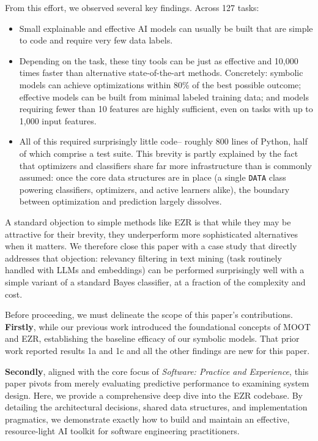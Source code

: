 \documentclass[AMA,STIX2COL]{WileyNJDv5}
\begin{document}
From this effort, we observed several key findings.
Across 127 tasks:
\begin{itemize}
\item
Small explainable and effective AI models can usually be built that are simple to code and require very few data labels. 
\item Depending on the task, these tiny tools can be just as effective and 10,000 times faster than alternative state-of-the-art methods. Concretely: symbolic models can achieve optimizations within 80\% of the best possible outcome; effective models can be built from minimal labeled training data; and models requiring fewer than 10 features are highly sufficient, even on tasks with up to 1,000 input features. 
\item
All of this required surprisingly little code-- roughly 800 lines of Python, half of which comprise a test suite. This brevity is partly explained by the fact that optimizers and classifiers share far more infrastructure than is commonly assumed: once the core data structures are in place (a single \texttt{DATA} class powering classifiers, optimizers, and active learners alike), the boundary between optimization and prediction largely dissolves.
\end{itemize}
A standard objection to simple methods like EZR is that while they may be attractive for their brevity, they underperform more sophisticated alternatives when it matters. We therefore close this paper with a case study that directly addresses that objection: relevancy filtering in text mining
(task routinely handled with LLMs and embeddings)  can be performed surprisingly well with a simple variant of a standard Bayes classifier, at a fraction of the complexity and cost.

 

Before proceeding, we must delineate the scope of this paper's contributions.
{\bf Firstly},
 while our previous work introduced the foundational concepts of MOOT and EZR,
establishing the baseline efficacy of our symbolic models. That
prior work reported results 1a and 1c and all the other findings are new
for this paper.  


{\bf Secondly}, aligned with the core focus of \textit{Software: Practice 
and Experience}, this paper pivots from merely evaluating predictive 
performance to examining system design. Here, we provide a comprehensive deep 
dive into the EZR codebase. By detailing the architectural decisions, shared
data structures, and implementation pragmatics, we demonstrate exactly how to 
build and maintain an effective, resource-light AI toolkit for software 
engineering practitioners.
 
\end{document}
